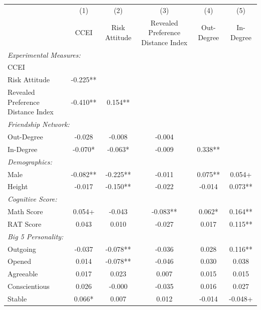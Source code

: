 \begin{tabular}{l*{5}{c}}
\toprule
  & (1) & (2) & (3) & (4) & (5) \\
  & CCEI & Risk Attitude & Revealed Preference Distance Index & Out-Degree & In-Degree \\
\midrule
\multicolumn{6}{l}{\textit{Experimental Measures:}} \\
\quad CCEI &  &  &  &  &  \\
\quad Risk Attitude & -0.225** &  &  &  &  \\
\quad Revealed Preference Distance Index & -0.410** & 0.154** &  &  &  \\
\multicolumn{6}{l}{\textit{Friendship Network:}} \\
\quad Out-Degree & -0.028 & -0.008 & -0.004 &  &  \\
\quad In-Degree & -0.070* & -0.063* & -0.009 & 0.338** &  \\
\multicolumn{6}{l}{\textit{Demographics:}} \\
\quad Male & -0.082** & -0.225** & -0.011 & 0.075** & 0.054+ \\
\quad Height & -0.017 & -0.150** & -0.022 & -0.014 & 0.073** \\
\multicolumn{6}{l}{\textit{Cognitive Score:}} \\
\quad Math Score & 0.054+ & -0.043 & -0.083** & 0.062* & 0.164** \\
\quad RAT Score & 0.043 & 0.010 & -0.027 & 0.017 & 0.115** \\
\multicolumn{6}{l}{\textit{Big 5 Personality:}} \\
\quad Outgoing & -0.037 & -0.078** & -0.036 & 0.028 & 0.116** \\
\quad Opened & 0.014 & -0.078** & -0.046 & 0.030 & 0.038 \\
\quad Agreeable & 0.017 & 0.023 & 0.007 & 0.015 & 0.015 \\
\quad Conscientious & 0.026 & -0.000 & -0.035 & 0.016 & 0.027 \\
\quad Stable & 0.066* & 0.007 & 0.012 & -0.014 & -0.048+ \\
\bottomrule
\end{tabular}
